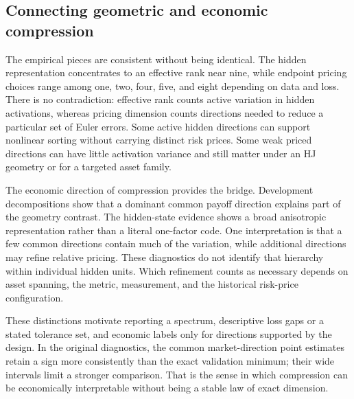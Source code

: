 \subsection{Connecting geometric and economic compression}

The empirical pieces are consistent without being identical. The hidden representation concentrates to an effective rank near nine, while endpoint pricing choices range among one, two, four, five, and eight depending on data and loss. There is no contradiction: effective rank counts active variation in hidden activations, whereas pricing dimension counts directions needed to reduce a particular set of Euler errors. Some active hidden directions can support nonlinear sorting without carrying distinct risk prices. Some weak priced directions can have little activation variance and still matter under an HJ geometry or for a targeted asset family.

The economic direction of compression provides the bridge. Development decompositions show that a dominant common payoff direction explains part of the geometry contrast. The hidden-state evidence shows a broad anisotropic representation rather than a literal one-factor code. One interpretation is that a few common directions contain much of the variation, while additional directions may refine relative pricing. These diagnostics do not identify that hierarchy within individual hidden units. Which refinement counts as necessary depends on asset spanning, the metric, measurement, and the historical risk-price configuration.

These distinctions motivate reporting a spectrum, descriptive loss gaps or a stated tolerance set, and economic labels only for directions supported by the design. In the original diagnostics, the common market-direction point estimates retain a sign more consistently than the exact validation minimum; their wide intervals limit a stronger comparison. That is the sense in which compression can be economically interpretable without being a stable law of exact dimension.

